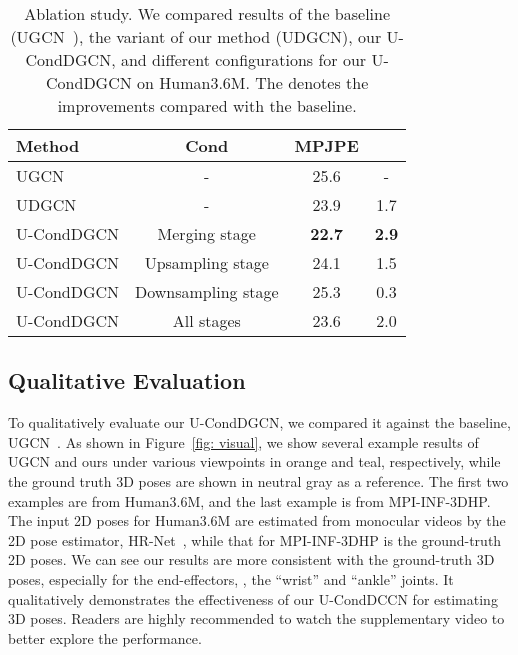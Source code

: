 \documentclass[sigconf]{acmart}
\begin{document}
\begin{table}[t]
\setlength{\tabcolsep}{1em}
	\centering
\caption {Ablation study. We compared results of the baseline (UGCN~\cite{wang2020motion}), the variant of our method (UDGCN), our U-CondDGCN, and different configurations for our U-CondDGCN on Human3.6M. The  denotes the improvements compared with the baseline.}
	\label{tab: abla_cfg}
	\vspace{-3mm}
	\begin{tabular}{@{}lccc@{}}
		\toprule
		Method     & Cond  & MPJPE           &        \\ \midrule
		UGCN       & -                  & 25.6            & -              \\
		UDGCN      & -                  & 23.9            & 1.7            \\
		U-CondDGCN & Merging stage      & \textbf{{22.7}} & \textbf{{2.9}} \\ 
		\midrule
		U-CondDGCN & Upsampling stage   & {24.1}          & {1.5}          \\
		U-CondDGCN & Downsampling stage & {25.3}          & {0.3}          \\
		U-CondDGCN & All stages         & {23.6}          & {2.0}          \\ 
		\bottomrule
	\end{tabular}
	\vspace{-5mm}
\end{table}





\vspace{-3mm}
\subsection{Qualitative Evaluation}
To qualitatively evaluate our U-CondDGCN, we compared it against the baseline, UGCN~\cite{wang2020motion}.
As shown in Figure~\ref{fig: visual}, we show several example results of UGCN and ours under various viewpoints in orange and teal, respectively, while the ground truth 3D poses are shown in neutral gray as a reference.
The first two examples are from Human3.6M, and the last example is from MPI-INF-3DHP.
The input 2D poses for Human3.6M are estimated from monocular videos by the 2D pose estimator, HR-Net~\cite{sun2019deep}, while that for MPI-INF-3DHP is the ground-truth 2D poses.
We can see our results are more consistent with the ground-truth 3D poses, especially for the end-effectors, \eg, the ``wrist'' and ``ankle'' joints.
It qualitatively demonstrates the effectiveness of our U-CondDCCN for estimating 3D poses.
Readers are highly recommended to watch the supplementary video to better explore the performance.
\end{document}
